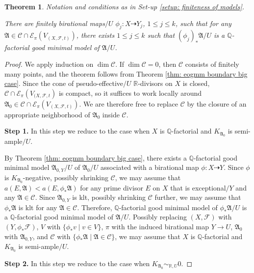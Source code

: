 \documentclass[12pt]{amsart}
\numberwithin{equation}{section}
\newcommand{\Rr}{\mathbb{R}}
\newcommand{\Aa}{{\mathfrak{A}}}
\newcommand{\Ff}{\mathcal{F}}
\newtheorem{thm}{Theorem}[section]
\theoremstyle{definition}
\theoremstyle{definition}
\theoremstyle{definition}
\begin{document}
\begin{thm}\label{thm: finiteness of log minimal model part i}
Notation and conditions as in Set-up \ref{setup: finiteness of models}.

There are finitely birational maps$/U$ $\phi_j: X\dashrightarrow Y_j$, $1\leq j\leq k$, such that for any $\Aa\in\mathcal{C}\cap\mathcal{E}_{\pi}(V_{(X,\Ff,t)})$, there exists $1\leq j\leq k$ such that $(\phi_j)_*\Aa/U$ is a $\mathbb Q$-factorial good minimal model of $\Aa/U$.
\end{thm}
\begin{proof}
We apply induction on $\dim\mathcal{C}$. If $\dim\mathcal{C}=0$, then $\mathcal{C}$ consists of finitely many points, and the theorem follows from Theorem \ref{thm: eogmm boundary big case}. Since the cone of pseudo-effective$/U$ $\Rr$-divisors on $X$ is closed, $\mathcal{C}\cap\mathcal{E}_{\pi}(V_{(X,\Ff,t})$ is compact, so it suffices to work locally around $\Aa_0\in\mathcal{C}\cap\mathcal{E}_{\pi}(V_{(X,\Ff,t)})$. We are therefore free to replace $\mathcal{C}$ by the closure of an appropriate
neighborhood of $\Aa_0$ inside $\mathcal{C}$.

\medskip

\noindent\textbf{Step 1.} In this step we reduce to the case when $X$ is $\mathbb Q$-factorial and $K_{\Aa_0}$ is semi-ample$/U$.

By Theorem \ref{thm: eogmm boundary big case}, there exists a $\mathbb Q$-factorial good minimal model $\Aa_{0,Y}/U$ of $\Aa_0/U$ associated with a birational map $\phi\colon X\dashrightarrow Y$. Since $\phi$ is $K_{\Aa_0}$-negative, possibly shrinking $\mathcal{C}$, we may assume that $a(E,\Aa)<a(E,\phi_*\Aa)$ for any prime divisor $E$ on $X$ that is exceptional$/Y$ and any $\Aa\in\mathcal{C}$. Since $\Aa_{0,Y}$ is klt, possibly shrinking $\mathcal{C}$ further, we may assume that $\phi_*\Aa$ is klt for any $\Aa\in\mathcal{C}$.
Therefore, $\mathbb Q$-factorial good minimal model of $\phi_*\Aa/U$ is a $\mathbb Q$-factorial good minimal model of $\Aa/U$. Possibly replacing $(X,\Ff)$ with $(Y,\phi_*\Ff)$, $V$ with $\{\phi_*v\mid v\in V\}$, $\pi$ with the induced birational map $Y\rightarrow U$, $\Aa_0$ with $\Aa_{0,Y}$, and $\mathcal{C}$ with $\{\phi_*\Aa\mid\Aa\in\mathcal{C}\}$, we may assume that $X$ is $\mathbb Q$-factorial and $K_{\Aa_0}$ is semi-ample$/U$.

\medskip

\noindent\textbf{Step 2.}  In this step we reduce to the case when $K_{\Aa_0}\sim_{\mathbb R,U}0$.


\end{proof}
\end{document}
